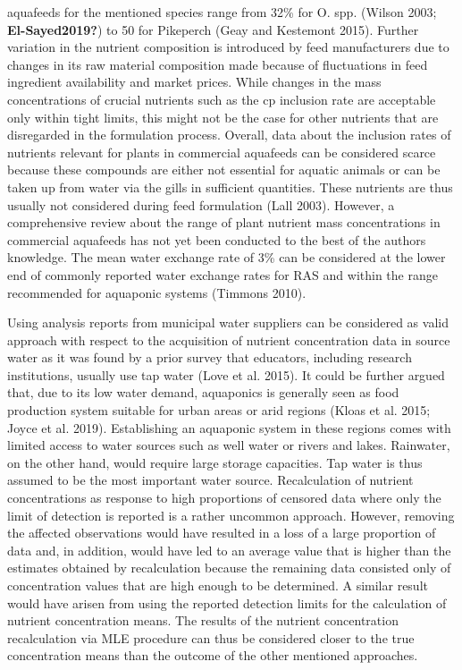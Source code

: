 \documentclass[preprint, 3p,
authoryear]{elsarticle} %
\begin{document}
aquafeeds for the mentioned species range from 32\% for O. spp. (Wilson
2003; \textbf{El-Sayed2019?}) to \SI{50}{\p} for Pikeperch (Geay and
Kestemont 2015). Further variation in the nutrient composition is
introduced by feed manufacturers due to changes in its raw material
composition made because of fluctuations in feed ingredient availability
and market prices. While changes in the mass concentrations of crucial
nutrients such as the \gls{cp} inclusion rate are acceptable only within
tight limits, this might not be the case for other nutrients that are
disregarded in the formulation process. Overall, data about the
inclusion rates of nutrients relevant for plants in commercial aquafeeds
can be considered scarce because these compounds are either not
essential for aquatic animals or can be taken up from water via the
gills in sufficient quantities. These nutrients are thus usually not
considered during feed formulation (Lall 2003). However, a comprehensive
review about the range of plant nutrient mass concentrations in
commercial aquafeeds has not yet been conducted to the best of the
authors knowledge. The mean water exchange rate of 3\% can be considered
at the lower end of commonly reported water exchange rates for RAS and
within the range recommended for aquaponic systems (Timmons 2010).

Using analysis reports from municipal water suppliers can be considered
as valid approach with respect to the acquisition of nutrient
concentration data in source water as it was found by a prior survey
that educators, including research institutions, usually use tap water
(Love et al. 2015). It could be further argued that, due to its low
water demand, aquaponics is generally seen as food production system
suitable for urban areas or arid regions (Kloas et al. 2015; Joyce et
al. 2019). Establishing an aquaponic system in these regions comes with
limited access to water sources such as well water or rivers and lakes.
Rainwater, on the other hand, would require large storage capacities.
Tap water is thus assumed to be the most important water source.
Recalculation of nutrient concentrations as response to high proportions
of censored data where only the limit of detection is reported is a
rather uncommon approach. However, removing the affected observations
would have resulted in a loss of a large proportion of data and, in
addition, would have led to an average value that is higher than the
estimates obtained by recalculation because the remaining data consisted
only of concentration values that are high enough to be determined. A
similar result would have arisen from using the reported detection
limits for the calculation of nutrient concentration means. The results
of the nutrient concentration recalculation via MLE procedure can thus
be considered closer to the true concentration means than the outcome of
the other mentioned approaches.
\end{document}
